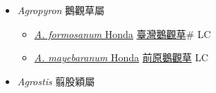 
  \begin{itemize}
 \item[] \textit{Agropyron} 鵝觀草屬
                    
  \begin{itemize}
        \item[] \href{http://www.theplantlist.org/tpl1.1/search?q=Agropyron+formosanum}{\textit{A. formosanum} Honda}   \href{\detokenize{http://taibnet.sinica.edu.tw/chi/taibnet_species_list.php?T2=臺灣鵝觀草&T2_new_value=true&fr=y}}{臺灣鵝觀草}\# LC
        \item[] \href{http://www.theplantlist.org/tpl1.1/search?q=Agropyron+mayebaranum}{\textit{A. mayebaranum} Honda}   \href{\detokenize{http://taibnet.sinica.edu.tw/chi/taibnet_species_list.php?T2=前原鵝觀草&T2_new_value=true&fr=y}}{前原鵝觀草} LC
  \end{itemize}
 \item[] \textit{Agrostis} 翦股穎屬
                    

\end{itemize}
